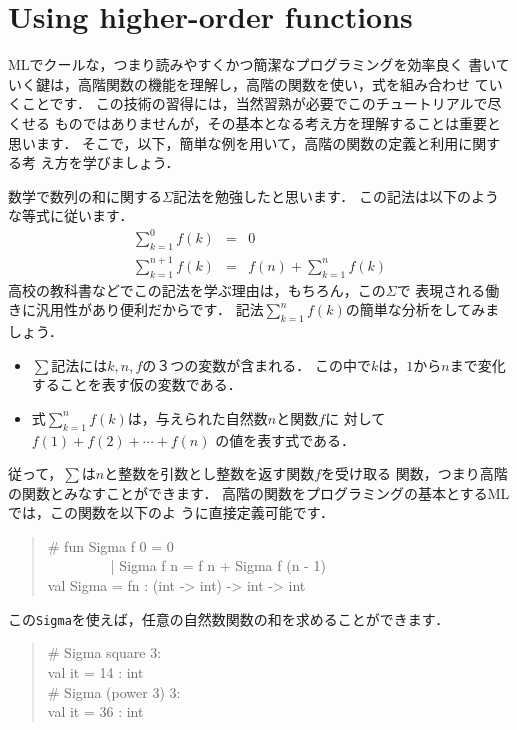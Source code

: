 \documentclass{jbook}
\newcommand{\txt}[2]{#2}
\begin{document}
\section{\txt{高階の関数の利用}{Using higher-order functions}}
\label{sec:tutorialHeigher-order-use}


\ifx\jp%
	MLでクールな，つまり読みやすくかつ簡潔なプログラミングを効率良く
書いていく鍵は，高階関数の機能を理解し，高階の関数を使い，式を組み合わせ
ていくことです．
	この技術の習得には，当然習熟が必要でこのチュートリアルで尽くせる
ものではありませんが，その基本となる考え方を理解することは重要と思います．
	そこで，以下，簡単な例を用いて，高階の関数の定義と利用に関する考
え方を学びましょう．

	数学で数列の和に関する$\Sigma$記法を勉強したと思います．
	この記法は以下のような等式に従います．
\begin{eqnarray*}
\sum_{k=1}^0 f(k) &=& 0\\
\sum_{k=1}^{n+1} f(k) &=& f(n) + \sum_{k=1}^{n} f(k)
\end{eqnarray*}
	高校の教科書などでこの記法を学ぶ理由は，もちろん，この$\Sigma$で
表現される働きに汎用性があり便利だからです．
	記法$\sum_{k=1}^n f(k)$の簡単な分析をしてみましょう．
\begin{itemize}
\item $\sum$記法には$k,n,f$の３つの変数が含まれる．
この中で$k$は，$1$から$n$まで変化することを表す仮の変数である．
\item 式$\sum_{k=1}^n f(k)$は，与えられた自然数$n$と関数$f$に
対して
$
f(1) + f(2) + \cdots + f(n)
$
の値を表す式である．
\end{itemize}
	従って，$\sum$は$n$と整数を引数とし整数を返す関数$f$を受け取る
関数，つまり高階の関数とみなすことができます．
	高階の関数をプログラミングの基本とするMLでは，この関数を以下のよ
うに直接定義可能です．
\begin{tt}
\begin{quote}
\# fun Sigma f 0 = 0\\
\ \ \ \ \ \ \ \ \  | Sigma f n = f n + Sigma f (n - 1)\\
val Sigma = fn : (int -> int) -> int -> int
\end{quote}
\end{tt}
この{\tt Sigma}を使えば，任意の自然数関数の和を求めることができます．
\begin{tt}
\begin{quote}
\# Sigma square 3:\\
val it = 14 : int\\
\# Sigma (power 3) 3:\\
val it = 36 : int
\end{quote}
\end{tt}
\end{document}
